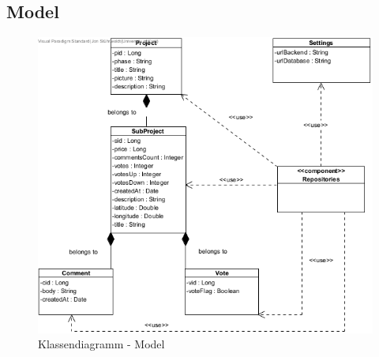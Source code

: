 \subsection{Model}
\begin{figure}[H]
	\centering
	\includegraphics[width=\textwidth]{img/classmodel.png}	
	\caption{Klassendiagramm - Model}
	\label{fig:klassendiagramm-model}
\end{figure}

